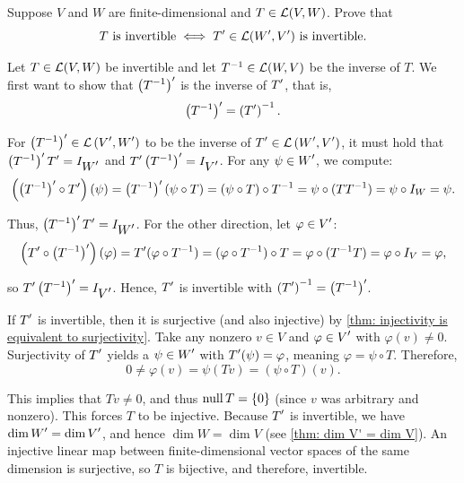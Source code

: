 \begin{xrcs}
  Suppose $V$ and $W$ are finite-dimensional and $T \in \mathcal{L}(V,W)$. Prove that
  \begin{equation}
    T \text{ is invertible} \iff \displaystyle T' \in \mathcal{L}(\displaystyle W', \displaystyle V') \text{ is invertible.}
  \end{equation}

  \begin{xprf}
    \Rightarrowdirection Let $T \in \mathcal{L}(V,W)$ be invertible and let $T^{-1} \in \mathcal{L}(W,V)$ be the inverse of $T$. We first want to show that $\displaystyle \left(T^{-1} \right)'$ is the inverse of $\displaystyle T'$, that is,
    \begin{equation}
      \displaystyle \left(T^{-1} \right)' = \left(\displaystyle T'\right)^{-1}.
    \end{equation}

    For $\displaystyle \left(T^{-1}\right)' \in {\mathcal{L}\left (\displaystyle V', \displaystyle W'\right )}$ to be the inverse of $\displaystyle T' \in {\mathcal{L}\left (\displaystyle W', \displaystyle V'\right )}$, it must hold that $\displaystyle \left(T^{-1}\right)' \displaystyle T' = I_{\displaystyle W'}$ and $\displaystyle T' \displaystyle \left(T^{-1}\right)' = I_{\displaystyle V'}$. For any $\psi \in \displaystyle W'$, we compute:
    \begin{equation}
      \left(\displaystyle \left(T^{-1}\right)' \circ \displaystyle T'\right)(\psi) = \displaystyle \left(T^{-1}\right)'(\psi \circ T)
      = (\psi \circ T) \circ T^{-1} = \psi \circ (T T^{-1}) = \psi \circ I_W = \psi.
    \end{equation}

    Thus, $\displaystyle \left(T^{-1}\right)' \displaystyle T' = I_{\displaystyle W'}$. For the other direction, let $\varphi \in \displaystyle V'$:
    \begin{equation}
      \left(\displaystyle T' \circ \displaystyle \left(T^{-1}\right)'\right)(\varphi) = \displaystyle T'(\varphi \circ T^{-1})
      = (\varphi \circ T^{-1}) \circ T = \varphi \circ (T^{-1} T) = \varphi \circ I_V = \varphi,
    \end{equation}

    so $\displaystyle T' \displaystyle \left(T^{-1}\right)' = I_{\displaystyle V'}$. Hence, $\displaystyle T'$ is invertible with $\left(\displaystyle T'\right)^{-1} = \displaystyle \left(T^{-1}\right)'$.

    \Leftarrowdirection If $\displaystyle T'$ is invertible, then it is surjective (and also injective) by \ref{thm: injectivity is equivalent to surjectivity}. Take any nonzero $v \in V$ and $\varphi \in \displaystyle V'$ with $\varphi (v) \neq 0$. Surjectivity of $\displaystyle T'$ yields a $\psi \in \displaystyle W'$ with $\displaystyle T'(\psi) = \varphi$, meaning $\varphi = \psi \circ T$. Therefore,
    \begin{equation}
      0 \neq \varphi(v) = \psi(Tv) = (\psi \circ T)(v).
    \end{equation}

    This implies that $Tv \neq 0$, and thus $\operatorname{null} T = \{0\}$ (since $v$ was arbitrary and nonzero). This forces $T$ to be injective. Because $\displaystyle T'$ is invertible, we have $\dim \displaystyle W' = \dim \displaystyle V'$, and hence $\dim W = \dim V$ (see \ref{thm: dim V' = dim V}). An injective linear map between finite-dimensional vector spaces of the same dimension is surjective, so $T$ is bijective, and therefore, invertible.
  \end{xprf}
\end{xrcs}

